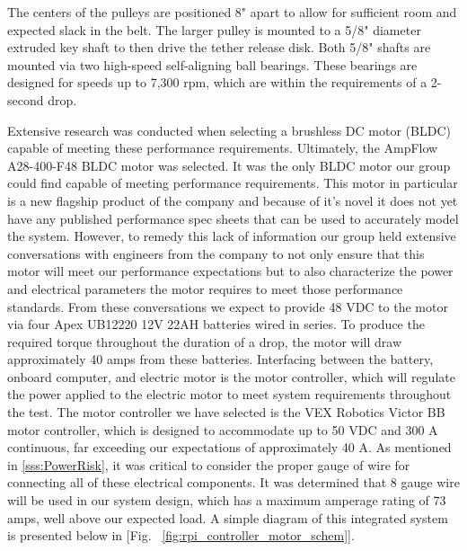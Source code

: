 The centers of the pulleys are positioned 8" apart to allow for sufficient room and expected slack in the belt. The larger pulley is mounted to a 5/8" diameter extruded key shaft to then drive the tether release disk. Both 5/8" shafts are mounted via two high-speed self-aligning ball bearings. These bearings are designed for speeds up to 7,300 rpm, which are within the requirements of a 2-second drop. 

Extensive research was conducted when selecting a brushless DC motor (BLDC) capable of meeting these performance requirements. Ultimately, the AmpFlow A28-400-F48 BLDC motor was selected. It was the only BLDC motor our group could find capable of meeting performance requirements. This motor in particular is a new flagship product of the company and because of it's novel it does not yet have any published performance spec sheets that can be used to accurately model the system. However, to remedy this lack of information our group held extensive conversations with engineers from the company to not only ensure that this motor will meet our performance expectations but to also characterize the power and electrical parameters the motor requires to meet those performance standards. From these conversations we expect to provide 48 VDC to the motor via four Apex UB12220 12V 22AH batteries wired in series. To produce the required torque throughout the duration of a drop, the motor will draw approximately 40 amps from these batteries. Interfacing between the battery, onboard computer, and electric motor is the motor controller, which will regulate the power applied to the electric motor to meet system requirements throughout the test. The motor controller we have selected is the VEX Robotics Victor BB motor controller, which is designed to accommodate up to 50 VDC and 300 A continuous, far exceeding our expectations of approximately 40 A. As mentioned in \ref{sss:PowerRisk}, it was critical to consider the proper gauge of wire for connecting all of these electrical components. It was determined that 8 gauge wire will be used in our system design, which has a maximum amperage rating of 73 amps, well above our expected load. A simple diagram of this integrated system is presented below in [Fig. ~\ref{fig:rpi_controller_motor_schem}].

